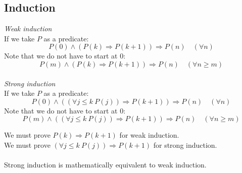 \documentclass{article}
\begin{document}
\subsection{Induction}
\textit{Weak induction}
\\
If we take $ P $ as a predicate:
\begin{equation}
P(0) \land (P(k) \Rightarrow P(k+1)) \Rightarrow P(n) \quad (\forall n)
\end{equation}
Note that we do not have to start at 0:
\begin{equation}
P(m) \land (P(k) \Rightarrow P(k+1)) \Rightarrow P(n) \quad (\forall n \geq m)
\end{equation}
\\
\textit{Strong induction}
\\
If we take $ P $ as a predicate:
\begin{equation}
P(0) \land ((\forall j \leq k \ P(j)) \Rightarrow P(k+1)) \Rightarrow P(n) \quad (\forall n)
\end{equation}
Note that we do not have to start at 0:
\begin{equation}
P(m) \land ((\forall j \leq k \ P(j)) \Rightarrow P(k+1)) \Rightarrow P(n) \quad (\forall n \geq m)
\end{equation}
\begin{tcolorbox}
We must prove $ P(k) \Rightarrow P(k+1) $ for weak induction.
\\
We must prove $ (\forall j \leq k \ P(j)) \Rightarrow P(k+1) $ for strong induction.
\\\\
Strong induction is mathematically equivalent to weak induction.
\end{tcolorbox}
\end{document}
